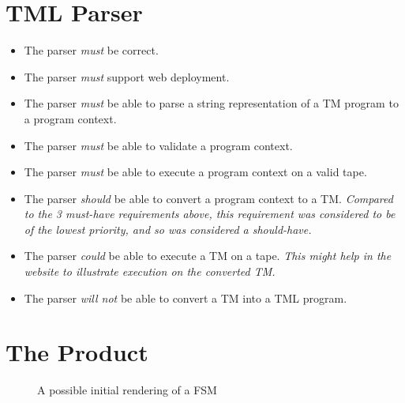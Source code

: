 \section{TML Parser}
\begin{itemize}
    \item The parser \emph{must} be correct.
    \item The parser \emph{must} support web deployment. 
    \item The parser \emph{must} be able to parse a string representation of a TM program to a program context.
    \item The parser \emph{must} be able to validate a program context.
    \item The parser \emph{must} be able to execute a program context on a valid tape.
    \item The parser \emph{should} be able to convert a program context to a TM. \textit{Compared to the 3 must-have requirements above, this requirement was considered to be of the lowest priority, and so was considered a should-have.}
    \item The parser \emph{could} be able to execute a TM on a tape. \textit{This might help in the website to illustrate execution on the converted TM.}
    \item The parser \emph{will not} be able to convert a TM into a TML program.
\end{itemize}

\section{The Product}

\begin{figure}[htb]
    \centering
    \caption{A possible initial rendering of a FSM}
    \label{fig:bad_FSM}
\end{figure}

